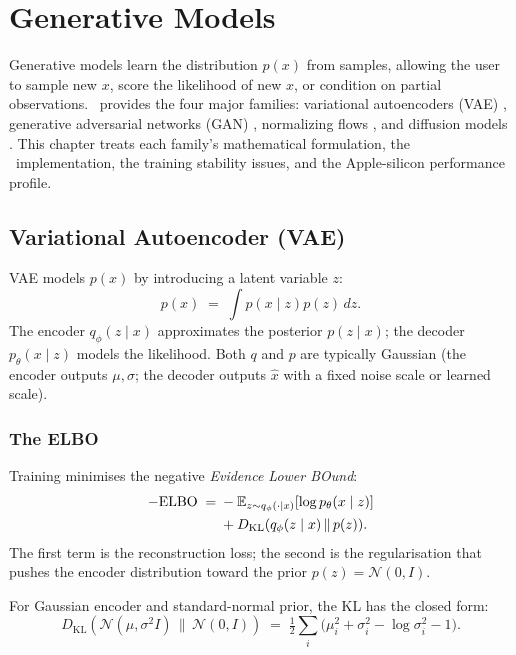 \chapter{Generative Models}
\label{ch:generative}

Generative models learn the distribution $p(x)$ from samples,
allowing the user to sample new $x$, score the likelihood of
new $x$, or condition on partial observations. \Lucid\ provides
the four major families: variational autoencoders (VAE)
\cite{kingma_vae_2014}, generative adversarial networks (GAN)
\cite{goodfellow_gan_2014, karras_stylegan_2019}, normalizing
flows \cite{rezende_nf_2015}, and diffusion models
\cite{ho_ddpm_2020, song_ncsn_2019, nichol_iddpm_2021,
song_score_sde_2021}. This chapter treats each family's
mathematical formulation, the \Lucid\ implementation, the
training stability issues, and the Apple-silicon performance
profile.

\section{Variational Autoencoder (VAE)}
\label{sec:generative:vae}

VAE \cite{kingma_vae_2014} models $p(x)$ by introducing a
latent variable $z$:
\[
  p(x) \;=\; \int p(x \mid z) p(z) \, dz.
\]
The encoder $q_\phi(z \mid x)$ approximates the posterior
$p(z \mid x)$; the decoder $p_\theta(x \mid z)$ models the
likelihood. Both $q$ and $p$ are typically Gaussian (the
encoder outputs $\mu, \sigma$; the decoder outputs $\hat{x}$
with a fixed noise scale or learned scale).

\subsection{The ELBO}
\label{ssec:generative:elbo}

Training minimises the negative \emph{Evidence Lower BOund}:
\begin{align}
  -\mathrm{ELBO} \;=\;& -\mathbb{E}_{z \sim q_\phi(\cdot \mid x)}[\log p_\theta(x \mid z)] \notag \\
  &+ D_{\mathrm{KL}}(q_\phi(z \mid x) \,\|\, p(z)).
\end{align}
The first term is the reconstruction loss; the second is the
regularisation that pushes the encoder distribution toward the
prior $p(z) = \mathcal{N}(0, I)$.

For Gaussian encoder and standard-normal prior, the KL has the
closed form:
\[
  D_{\mathrm{KL}}(\mathcal{N}(\mu, \sigma^2 I) \,\|\, \mathcal{N}(0, I))
  \;=\;
  \tfrac{1}{2} \sum_i \bigl(\mu_i^2 + \sigma_i^2 - \log \sigma_i^2 - 1\bigr).
\]

